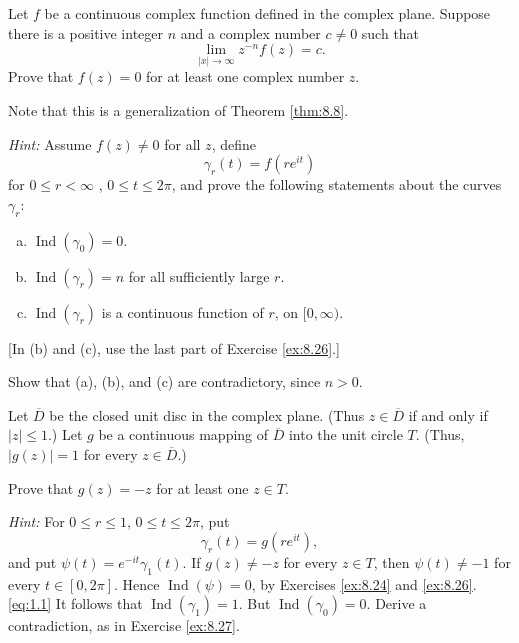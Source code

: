 \begin{myExercise}
    \label{ex:8.27}
    Let $f$ be a continuous complex function defined in the complex plane. 
    Suppose there is a positive integer $n$ and a complex number $c \neq 0$ such that
    \begin{equation*}
        \lim_{|x| \to \infty} z^{-n} f(z) = c.
    \end{equation*}
    Prove that $f(z) = 0$ for at least one complex number $z$.

    Note that this is a generalization of Theorem \ref{thm:8.8}.

    \emph{Hint:} Assume $f(z) \neq 0$ for all $z$, define
    \begin{equation*}
        \gamma_r(t) = f(re^{it})
    \end{equation*}
    for $0 \leq r < \infty$ , $0 \leq t \leq 2\pi$, 
    and prove the following statements about the curves $\gamma_r$:
    \begin{enumerate}[(a)]
        \item $\operatorname{Ind}(\gamma_0)=0$.
        \item $\operatorname{Ind}(\gamma_r)=n$ for all sufficiently large $r$.
        \item $\operatorname{Ind}(\gamma_r)$ is a continuous function of $r$, on $[0, \infty)$.
    \end{enumerate}
    [In (b) and (c), use the last part of Exercise \ref{ex:8.26}.]
    
    Show that (a), (b), and (c) are contradictory, since $n > 0$.
\end{myExercise}


\begin{myExercise}
    \label{ex:8.28}
    Let $\overline{D}$ be the closed unit disc in the complex plane. 
    (Thus $z \in \overline{D}$ if and only if $| z | \leq 1$.) 
    Let $g$ be a continuous mapping of $\overline{D}$ into the unit circle $T$. 
    (Thus, $|g(z)| = 1$ for every $z \in \overline{D}$.)

    Prove that $g(z) = - z$ for at least one $z \in T$.
    
    \emph{Hint:} For $0 \leq r \leq 1$, $0 \leq t \leq 2\pi$, put
    \begin{equation*}
        \gamma_r(t) = g(r e^{it}),
    \end{equation*}
    and put $\psi(t) = e^{-it} \gamma_1(t)$. 
    If $g(z) \neq -z$ for every $z \in T$, 
    then $\psi(t) \neq -1$ for every $t \in [0, 2\pi]$. 
    Hence $\operatorname{Ind} (\psi) = 0$, by Exercises \ref{ex:8.24} and \ref{ex:8.26}. \eqref{eq:1.1}
    It follows that $\operatorname{Ind} (\gamma_1) = 1$.
    But $\operatorname{Ind} (\gamma_0)= 0$. 
    Derive a contradiction, as in Exercise \ref{ex:8.27}.
\end{myExercise}



